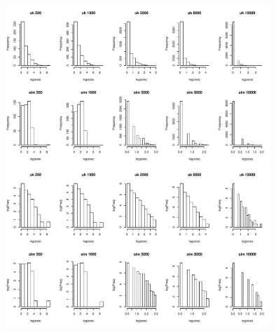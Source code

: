 \documentclass[]{revtex4}\usepackage[]{graphicx}\usepackage[]{color}
\newenvironment{knitrout}{}{} %
\begin{document}
\begin{knitrout}
{\centering \includegraphics[width=10cm]{figure/plotplot_cluster_size-1} 
\includegraphics[width=10cm]{figure/plotplot_cluster_size-2} 

}



\end{knitrout}
\end{document}
